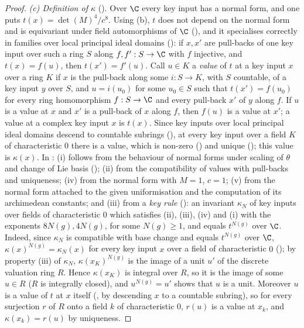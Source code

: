 \begin{proof}
\emph{(c) Definition of $\kappa$} (). Over $\C$ every key input has a normal
form, and one puts $t(x)=\det(M)^4/c^8$. Using (b), $t$ does not depend on the normal form and is equivariant under
field automorphisms of $\C$ (), and it specialises correctly in
families over local principal ideal domains (): if $x,x'$ are
pull-backs of one key input over such a ring $S$ along $f,f':S\to\C$ with $f$ injective, and $t(x)=f(u)$, then
$t(x')=f'(u)$. Call $u\in K$ a \emph{value} of $t$ at a key input $x$ over a ring $K$ if $x$ is the pull-back along
some $i:S\to K$, with $S$ countable, of a key input $y$ over $S$, and $u=i(u_0)$ for some $u_0\in S$ such that
$t(x')=f(u_0)$ for every ring homomorphism $f:S\to\C$ and every pull-back $x'$ of $y$ along $f$. If $u$ is a value at
$x$ and $x'$ is a pull-back of $x$ along $f$, then $f(u)$ is a value at $x'$; a value at a complex key input $x$ is
$t(x)$. Since key inputs over local principal ideal domains descend to countable subrings
(), at every key input over a field $K$ of characteristic
$0$ there is a value, which is non-zero () and unique
(); this value is $\kappa(x)$. In
: (i) follows from the behaviour of normal forms under scaling of
$\theta$ and change of Lie basis (); (ii) from the compatibility of
values with pull-backs and uniqueness; (iv) from the normal form with $M=1$, $c=1$; (v) from the normal form attached to
the given uniformisation and the computation of its archimedean constants; and (iii) from a \emph{key rule}
(): an invariant $\kappa_N$ of key inputs over fields of
characteristic $0$ which satisfies (ii), (iii), (iv) and (i) with the exponents $8N(g),4N(g)$, for some $N(g)\ge1$, and
equals $t^{N(g)}$ over $\C$. Indeed, since $\kappa_N$ is compatible with base change and equals $t^{N(g)}$ over $\C$,
$\kappa(x)^{N(g)}=\kappa_N(x)$ for every key input $x$ over a field of characteristic $0$
(); by property (iii) of $\kappa_N$, $\kappa(x_K)^{N(g)}$
is the image of a unit $u'$ of the discrete valuation ring $R$. Hence $\kappa(x_K)$ is integral over $R$, so it is the
image of some $u\in R$ ($R$ is integrally closed), and $u^{N(g)}=u'$ shows that $u$ is a unit. Moreover $u$ is a value of
$t$ at $x$ itself (, by descending $x$ to a countable subring), so for every
surjection $r$ of $R$ onto a field $k$ of characteristic $0$, $r(u)$ is a value at $x_k$, and $\kappa(x_k)=r(u)$ by
uniqueness.
\end{proof}
